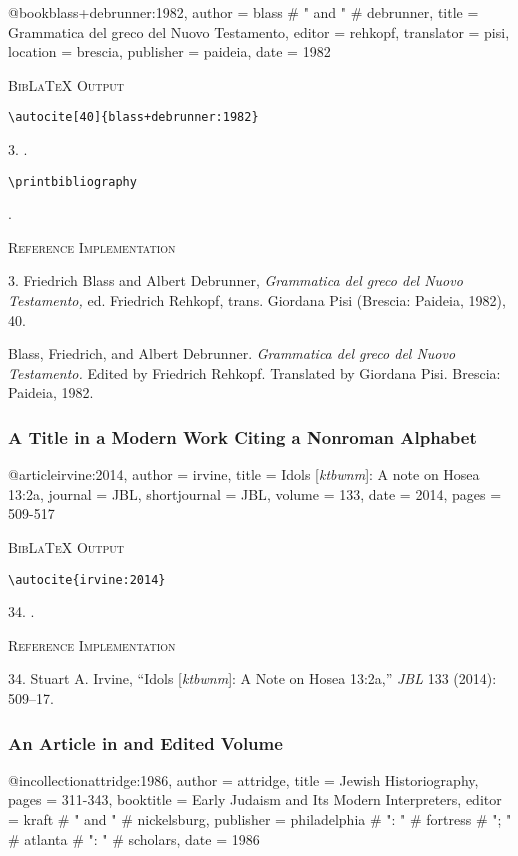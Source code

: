 \documentclass[a4paper]{article}
\newcommand\citetestns[3]{%
  {\textsc{BibLaTeX Output}\par
   \nobreak
   \texttt{\textbackslash autocite[#2]\{#3\}}\par
   \color{biblatex-colour}
   #1. \cite[#2]{#3}.\par
   \color{black}
   \texttt{\textbackslash printbibliography}\par
   \color{biblatex-colour}
   \hangindent\bibindent\bibentrycite{#3}.\par}}
\newcommand\citetestnsnpnb[2]{%
  {\textsc{BibLaTeX Output}\par
   \nobreak
   \texttt{\textbackslash autocite\{#2\}}\par
   \color{biblatex-colour}
   #1. \cite{#2}.\par}}
\newenvironment{refimp}{%
  \begin{minipage}{\linewidth}
    \setlength{\parskip}{1ex}
    \textsc{Reference Implementation}\par
    \nobreak
    \color{reference-colour}
}{\end{minipage}}
\newenvironment{vb}{%
  \setlength{\parskip}{0pt}
  \verbatim}{\endverbatim}
\begin{document}
\begin{vb}
@book{blass+debrunner:1982,
  author = blass # " and " # debrunner,
  title = {Grammatica del greco del Nuovo Testamento},
  editor = rehkopf,
  translator = pisi,
  location = brescia,
  publisher = paideia,
  date = {1982}
}
\end{vb}  

\citetestns{3}{40}{blass+debrunner:1982}

\begin{refimp}
  3. Friedrich Blass and Albert Debrunner, \emph{Grammatica del greco del
  Nuovo Testamento,} ed. Friedrich Rehkopf, trans. Giordana Pisi (Brescia:
  Paideia, 1982), 40.

  \hangindent\bibindent Blass, Friedrich, and Albert Debrunner.
  \emph{Grammatica del greco del Nuovo Testamento.} Edited by Friedrich
  Rehkopf. Translated by Giordana Pisi. Brescia: Paideia, 1982.
\end{refimp}

\subsubsection{A Title in a Modern Work Citing a Nonroman Alphabet}

\begin{vb}
@article{irvine:2014,
  author = irvine,
  title = {Idols [\emph{ktbwnm}]: A note on Hosea 13:2a},
  journal = JBL,
  shortjournal = {JBL},
  volume = {133},
  date = {2014},
  pages = {509-517}
}
\end{vb}

\citetestnsnpnb{34}{irvine:2014}

\begin{refimp}
  34. Stuart A. Irvine, “Idols [\emph{ktbwnm}]: A Note on Hosea 13:2a,”
  \emph{JBL} 133 (2014): 509–17.
\end{refimp}

\subsubsection{An Article in and Edited Volume}

\begin{vb}
@incollection{attridge:1986,
  author = attridge,
  title = {Jewish Historiography},
  pages = {311-343},
  booktitle = {Early Judaism and Its Modern Interpreters},
  editor = kraft # " and " # nickelsburg,
  publisher = philadelphia # ": " # fortress # "; " #
              atlanta # ": " # scholars,
  date = {1986}
}
\end{vb}  
\end{document}
